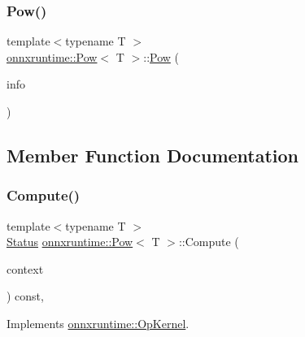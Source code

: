 \subsubsection{\texorpdfstring{Pow()}{Pow()}}
{\footnotesize\ttfamily template$<$typename T $>$ \\
\mbox{\hyperlink{classonnxruntime_1_1Pow}{onnxruntime\+::\+Pow}}$<$ T $>$\+::\mbox{\hyperlink{classonnxruntime_1_1Pow}{Pow}} (\begin{DoxyParamCaption}\item[{const \mbox{\hyperlink{classonnxruntime_1_1OpKernelInfo}{Op\+Kernel\+Info}} \&}]{info }\end{DoxyParamCaption})\hspace{0.3cm}{\ttfamily [inline]}}



\subsection{Member Function Documentation}
\mbox{\label{classonnxruntime_1_1Pow_a6776c40d0db3a94faec0aac3c175ae22}} 
\subsubsection{\texorpdfstring{Compute()}{Compute()}\hspace{0.1cm}{\footnotesize\ttfamily [1/2]}}
{\footnotesize\ttfamily template$<$typename T $>$ \\
\mbox{\hyperlink{classonnxruntime_1_1common_1_1Status}{Status}} \mbox{\hyperlink{classonnxruntime_1_1Pow}{onnxruntime\+::\+Pow}}$<$ T $>$\+::Compute (\begin{DoxyParamCaption}\item[{\mbox{\hyperlink{classonnxruntime_1_1OpKernelContext}{Op\+Kernel\+Context}} $\ast$}]{context }\end{DoxyParamCaption}) const\hspace{0.3cm}{\ttfamily [override]}, {\ttfamily [virtual]}}



Implements \mbox{\hyperlink{classonnxruntime_1_1OpKernel_a9eca8656a78b1b3ab9d3351a12798650}{onnxruntime\+::\+Op\+Kernel}}.

\mbox{\label{classonnxruntime_1_1Pow_a84a36bbbc486008585a31365dc2936b9}} 
